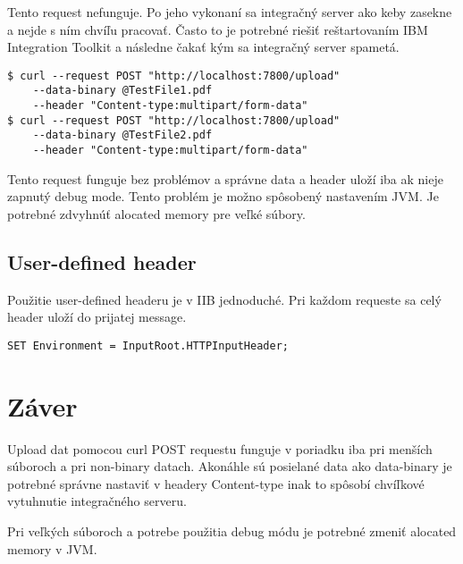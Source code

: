 \documentclass[a4paper]{article}
\begin{document}
Tento request nefunguje. Po jeho vykonaní sa integračný server ako keby zasekne a nejde s ním chvíľu pracovať.
Často to je potrebné riešiť reštartovaním IBM Integration Toolkit a následne čakať kým sa integračný server spametá.

\lstset{title=Vstup, language=bash}
\begin{lstlisting}
$ curl --request POST "http://localhost:7800/upload" 
	--data-binary @TestFile1.pdf 
	--header "Content-type:multipart/form-data"
$ curl --request POST "http://localhost:7800/upload" 
	--data-binary @TestFile2.pdf 
	--header "Content-type:multipart/form-data"
\end{lstlisting}

Tento request funguje bez problémov a správne data a header uloží iba ak nieje zapnutý debug mode. Tento problém je možno
spôsobený nastavením JVM. Je potrebné zdvyhnúť alocated memory pre veľké súbory.

\subsection{User-defined header}

Použitie user-defined headeru je v IIB jednoduché. Pri každom requeste sa celý header uloží do prijatej message.
\lstset{title=ESQL príklad, language=sql}
\begin{lstlisting}
SET Environment = InputRoot.HTTPInputHeader;
\end{lstlisting}
\section{Záver}

Upload dat pomocou curl POST requestu funguje v poriadku iba pri menších súboroch a pri non-binary datach. Akonáhle sú posielané 
data ako data-binary je potrebné správne nastaviť v headery Content-type inak to spôsobí chvíľkové vytuhnutie integračného serveru.

Pri veľkých súboroch a potrebe použitia debug módu je potrebné zmeniť alocated memory v JVM.
\end{document}
